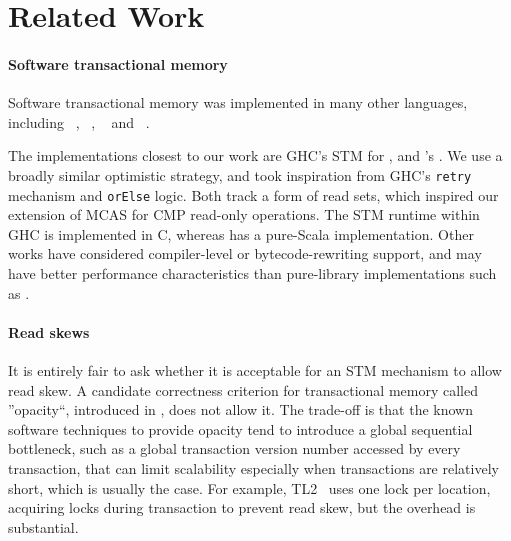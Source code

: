 \section{Related Work}
\label{sec:related_work}

\paragraph{Software transactional memory}

Software transactional memory was implemented in many other languages, including \Cpp~\citep{wyatt-stm}, \CSharp~\citep{DBLP:conf/pldi/HarrisPST06}, \Haskell~\citep{DBLP:conf/ppopp/HarrisMPH05} and \Scala~\citep{scala-stm,zio}.

The implementations closest to our work are GHC's STM for \Haskell, and \Scala's \ZIO. We use a broadly similar optimistic strategy, and took inspiration from GHC's \texttt{retry} mechanism and \texttt{orElse} logic. Both track a form of read sets, which inspired our extension of MCAS for CMP read-only operations. The STM runtime within GHC is implemented in C, whereas \ZIO has a pure-Scala implementation. Other works have considered compiler-level or bytecode-rewriting support, and may have better performance characteristics than pure-library implementations such as \Kcas.




\paragraph{Read skews}

It is entirely fair to ask whether it is acceptable for an STM mechanism to allow read skew.
A candidate correctness criterion for transactional memory called ''opacity``, introduced in \citet{DBLP:conf/ppopp/GuerraouiK08}, does not allow it.
The trade-off is that the known software techniques to provide opacity tend to introduce a global sequential bottleneck, such as a global transaction version number accessed by every transaction, that can limit scalability especially when transactions are relatively short, which is usually the case. For example, TL2~\citep{DBLP:conf/wdag/DiceSS06} uses one lock per location, acquiring locks during transaction to prevent read skew, but the overhead is substantial.

